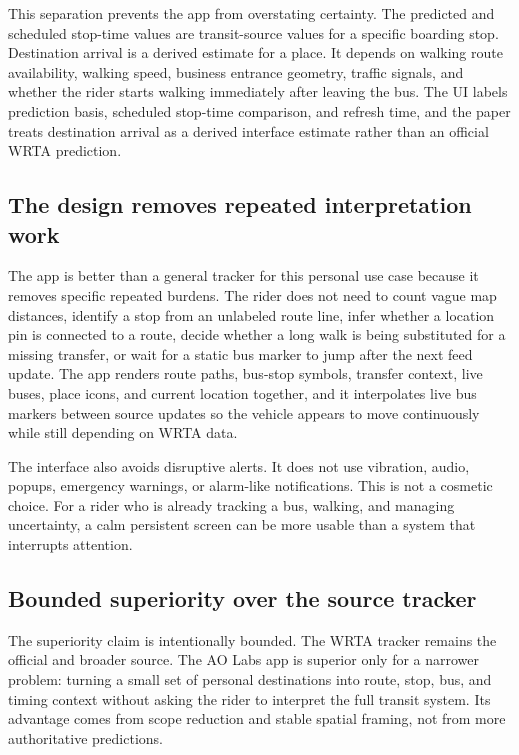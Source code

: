 \documentclass[12pt,letterpaper]{article}
\begin{document}
This separation prevents the app from overstating certainty. The predicted and scheduled stop-time values are transit-source values for a specific boarding stop. Destination arrival is a derived estimate for a place. It depends on walking route availability, walking speed, business entrance geometry, traffic signals, and whether the rider starts walking immediately after leaving the bus. The UI labels prediction basis, scheduled stop-time comparison, and refresh time, and the paper treats destination arrival as a derived interface estimate rather than an official WRTA prediction.

\subsection{The design removes repeated interpretation work}

The app is better than a general tracker for this personal use case because it removes specific repeated burdens. The rider does not need to count vague map distances, identify a stop from an unlabeled route line, infer whether a location pin is connected to a route, decide whether a long walk is being substituted for a missing transfer, or wait for a static bus marker to jump after the next feed update. The app renders route paths, bus-stop symbols, transfer context, live buses, place icons, and current location together, and it interpolates live bus markers between source updates so the vehicle appears to move continuously while still depending on WRTA data.

The interface also avoids disruptive alerts. It does not use vibration, audio, popups, emergency warnings, or alarm-like notifications. This is not a cosmetic choice. For a rider who is already tracking a bus, walking, and managing uncertainty, a calm persistent screen can be more usable than a system that interrupts attention.

\subsection{Bounded superiority over the source tracker}

The superiority claim is intentionally bounded. The WRTA tracker remains the official and broader source. The AO Labs app is superior only for a narrower problem: turning a small set of personal destinations into route, stop, bus, and timing context without asking the rider to interpret the full transit system. Its advantage comes from scope reduction and stable spatial framing, not from more authoritative predictions.
\end{document}
